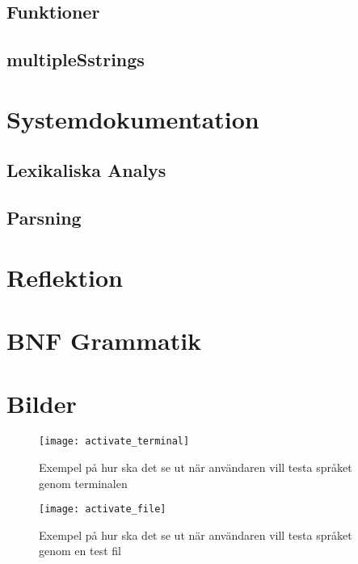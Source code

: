 \documentclass{TDP019mall}
\begin{document}
\subsection{Funktioner}

\subsection{multipleSstrings}



\section{Systemdokumentation}

\subsection{Lexikaliska Analys}

\subsection{Parsning}



\section{Reflektion}




\section{BNF Grammatik}


\newpage
\section{Bilder}

\begin{figure}[h]
\caption{Exempel på hur ska det se ut när användaren vill testa språket genom terminalen}
\centering
\texttt{[image: activate\_terminal]}
\end{figure}

\begin{figure}[h]
\caption{Exempel på hur ska det se ut när användaren vill testa språket genom en test fil}
\centering
\texttt{[image: activate\_file]}
\end{figure}
\end{document}
